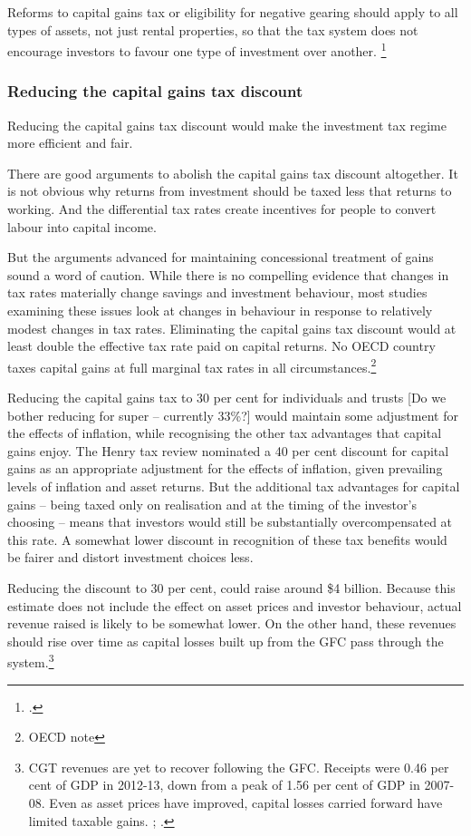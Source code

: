 \documentclass{grattan}\usepackage[]{graphicx}\usepackage[]{color}
\begin{document}
Reforms to capital gains tax or eligibility for negative gearing should apply to all types of assets, not just rental properties, so that the tax system does not encourage investors to favour one type of investment over another.  \footcite[p.~133]{Commission2004}

\subsubsection{Reducing the capital gains tax discount}
Reducing the capital gains tax discount would make the investment tax regime more efficient and fair. 

There are good arguments to abolish the capital gains tax discount altogether. It is not obvious why returns from investment should be taxed less that returns to working. And the differential tax rates create incentives for people to convert labour into capital income. 

But the arguments advanced for maintaining concessional treatment of gains sound a word of caution. While there is no compelling evidence that changes in tax rates materially change savings and investment behaviour, most studies examining these issues look at changes in behaviour in response to relatively modest changes in tax rates. Eliminating the capital gains tax discount would at least double the effective tax rate paid on capital returns. No OECD country taxes capital gains at full marginal tax rates in all circumstances.\footnote{OECD note} 

Reducing the capital gains tax to 30 per cent for individuals and trusts [Do we bother reducing for super -- currently 33\%?] would maintain some adjustment for the effects of inflation, while recognising the other tax advantages that capital gains enjoy. The Henry tax review nominated a 40 per cent discount for capital gains as an appropriate adjustment for the effects of inflation, given prevailing levels of inflation and asset returns.  But the additional tax advantages for capital gains -- being taxed only on realisation and at the timing of the investor's choosing -- means that investors would still be substantially overcompensated at this rate. A somewhat lower discount in recognition of these tax benefits would be fairer and distort investment choices less. 

Reducing the discount to 30 per cent, could raise around \$4 billion. Because this estimate does not include the effect on asset prices and investor behaviour, actual revenue raised is likely to be somewhat lower. On the other hand, these revenues should rise over time as capital losses built up from the GFC pass through the system.\footnote{CGT revenues are yet to recover following the GFC. Receipts were 0.46 per cent of GDP in 2012-13, down from a peak of 1.56 per cent of GDP in 2007-08. Even as asset prices have improved, capital losses carried forward have limited taxable gains. \textcite{Stewart2015}; \textcite{PBO2014}. }
\end{document}

